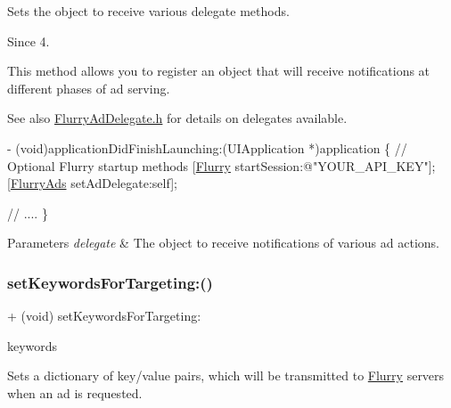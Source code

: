 Sets the object to receive various delegate methods. 

\begin{DoxySince}{Since}
4.
\end{DoxySince}
This method allows you to register an object that will receive notifications at different phases of ad serving.

\begin{DoxySeeAlso}{See also}
\hyperlink{FlurryAdDelegate_8h_source}{Flurry\+Ad\+Delegate.\+h} for details on delegates available.
\end{DoxySeeAlso}

\begin{DoxyCode}
- (void)applicationDidFinishLaunching:(UIApplication *)application 
\{
    \textcolor{comment}{// Optional Flurry startup methods}
    [\hyperlink{interfaceFlurry}{Flurry} startSession:\textcolor{stringliteral}{@"YOUR\_API\_KEY"}];
    [\hyperlink{interfaceFlurryAds}{FlurryAds} setAdDelegate:\textcolor{keyword}{self}];

    \textcolor{comment}{// ....}
\}
\end{DoxyCode}



\begin{DoxyParams}{Parameters}
{\em delegate} & The object to receive notifications of various ad actions. \\
\hline
\end{DoxyParams}
\mbox{\label{interfaceFlurryAds_ab20cb7f809e23a2a3a4984f6759144bc}} 
\subsubsection{\texorpdfstring{set\+Keywords\+For\+Targeting\+:()}{setKeywordsForTargeting:()}}
{\footnotesize\ttfamily + (void) set\+Keywords\+For\+Targeting\+: \begin{DoxyParamCaption}\item[{(N\+S\+Dictionary $\ast$)}]{keywords }\end{DoxyParamCaption}}



Sets a dictionary of key/value pairs, which will be transmitted to \hyperlink{interfaceFlurry}{Flurry} servers when an ad is requested. 

